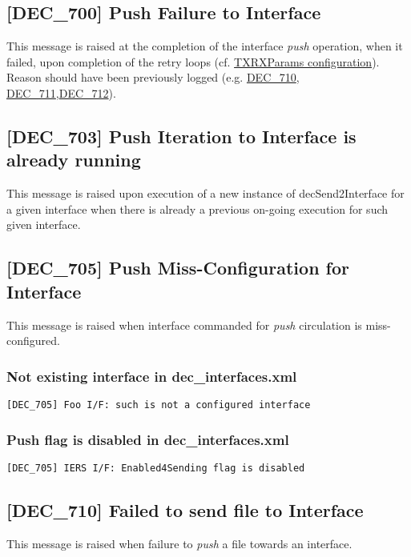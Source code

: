 \documentclass[dec_sum_main.tex]{subfiles}
\begin{document}
\label{DEC700}
\subsection{[DEC\_700] Push Failure to Interface}
This message is raised at the completion of the interface \textit{push} operation, when it failed, upon completion of the retry loops (cf. \hyperref[TXRXParams]{TXRXParams configuration}). Reason should have been previously logged (e.g. \hyperref[DEC710]{DEC\_710}, \hyperref[DEC711]{DEC\_711},\hyperref[DEC712]{DEC\_712}). 

\label{DEC703}
\subsection{[DEC\_703]  Push Iteration to Interface is already running}
This message is raised upon execution of a new instance of decSend2Interface for a given interface when there is already a previous on-going execution for such given interface.

\label{DEC705}
\subsection{[DEC\_705] Push Miss-Configuration for Interface}
This message is raised when interface commanded for \textit{push} circulation is miss-configured.

\subsubsection{Not existing interface in dec\_interfaces.xml }
\begin{verbatim}
[DEC_705] Foo I/F: such is not a configured interface
\end{verbatim}

\subsubsection{Push flag is disabled in dec\_interfaces.xml }
\begin{verbatim}
[DEC_705] IERS I/F: Enabled4Sending flag is disabled
\end{verbatim}

\label{DEC710}
\subsection{[DEC\_710] Failed to send file to Interface}
This message is raised when failure to \textit{push} a file towards an interface.
\end{document}
